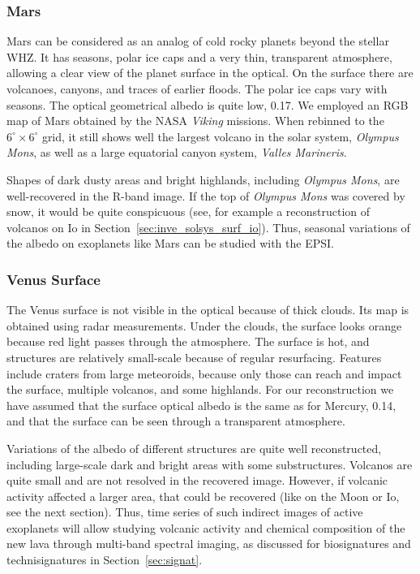 \documentclass{emulateapj}
\begin{document}
\subsubsection{Mars}\label{sec:inve_solsys_surf_mars}

Mars can be considered as an analog of cold rocky planets beyond
the stellar WHZ. It has seasons, polar ice caps and a very thin, transparent 
atmosphere, allowing a clear view of the planet surface in the optical.
On the surface there are volcanoes, canyons, and traces of earlier floods.
The polar ice caps vary with seasons. The optical geometrical albedo is
quite low, 0.17.
We employed an RGB map of Mars obtained by the NASA {\em Viking} missions.
When rebinned to the $6^\circ\times6^\circ$ grid, it still shows well the largest 
volcano in the solar system, {\em Olympus Mons}, 
as well as a large equatorial canyon system, {\em Valles Marineris}.

Shapes of dark dusty areas and bright highlands, including {\em Olympus Mons}, 
are well-recovered in the R-band image. 
If the top of {\em Olympus Mons} was covered by snow, it would be quite conspicuous
(see, for example a reconstruction of volcanos on Io in Section~\ref{sec:inve_solsys_surf_io}).
Thus, seasonal variations of the albedo on exoplanets like Mars
can be studied with the EPSI.

\subsubsection{Venus Surface}\label{sec:inve_solsys_surf_ven}

The Venus surface is not visible in the optical because of thick clouds.
Its map is obtained using radar measurements. Under the clouds, the surface looks
orange because red light passes through the atmosphere. 
The surface is hot, and structures are relatively small-scale because of regular
resurfacing. Features include craters from large meteoroids, because only those can reach
and impact the surface, multiple volcanos, and some highlands.
For our reconstruction we have assumed that the surface optical albedo is the same 
as for Mercury, 0.14, and that the surface can be seen through a transparent atmosphere.

Variations of the albedo of different structures are quite well reconstructed, 
including large-scale dark and bright areas with some substructures. Volcanos are
quite small and are not resolved in the recovered image. However, if volcanic
activity affected a larger area, that could be recovered (like on the Moon or Io, see the next section). 
Thus, time series of such indirect images of active exoplanets will allow studying volcanic
activity and chemical composition of the new lava through multi-band
spectral imaging, as discussed for biosignatures and technisignatures in 
Section~\ref{sec:signat}.
\end{document}

